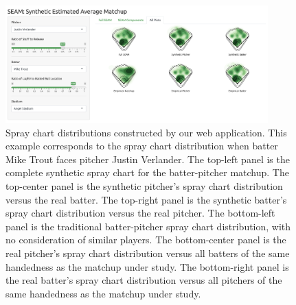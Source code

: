 \documentclass[12pt]{article}
\begin{document}
\begin{figure}
\centering
    \includegraphics[width=0.90\textwidth]{ncombined.png}
    \caption{Spray chart distributions constructed by our web application.  This example
    corresponds to the spray chart distribution when batter Mike Trout faces
    pitcher Justin Verlander.
    The top-left panel is the complete synthetic spray chart for
      the batter-pitcher matchup.
    The top-center panel is the synthetic pitcher's spray chart distribution
      versus the real batter.
    The top-right panel is the synthetic batter's spray chart distribution
      versus the real pitcher. 
    The bottom-left panel is the traditional batter-pitcher spray chart
      distribution, with no consideration of similar players.   
    The bottom-center panel is the real pitcher's spray chart distribution versus all batters of the same handedness as the matchup under study.
    The bottom-right panel is the real batter's spray chart distribution versus all pitchers of the same handedness as the matchup under study.
}
    \label{spraydists}
\end{figure}



\end{document}
